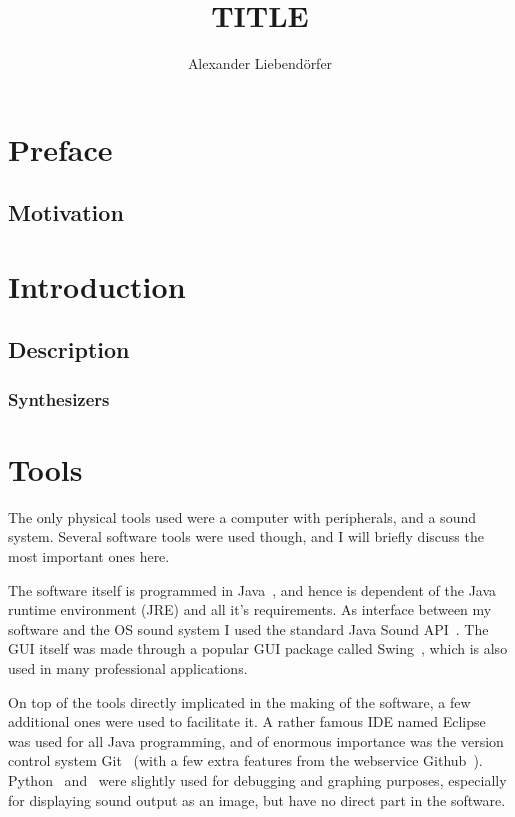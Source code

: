 \documentclass[11pt,a4paper]{article}
\title{\LARGE \textbf {TITLE} \vspace{1em}}
\author{Alexander Liebend\"{o}rfer}
\begin{document}
\maketitle
\clearpage
\tableofcontents

\clearpage

\section{Preface}

\subsection{Motivation}

\section{Introduction}

\subsection{Description}

\subsubsection{Synthesizers}

\section{Tools}

The only physical tools used were a computer with peripherals, and a sound system. Several software tools were used though, and I will briefly discuss the most important ones here.

The software itself is programmed in Java~\cite{Java}, and hence is dependent of the Java runtime environment (JRE) and all it's requirements. As interface between my software and the OS sound system I used the standard Java Sound API~\cite{Javasound}. The GUI itself was made through a popular GUI package called Swing~\cite{Swing}, which is also used in many professional applications.

On top of the tools directly implicated in the making of the software, a few additional ones were used to fac‎ilitate it. A rather famous IDE named Eclipse~\cite{Eclipse} was used for all Java programming, and of enormous importance was the version control system Git~\cite{Git} (with a few extra features from the webservice Github~\cite{Github}). Python~\cite{Python} and~\cite{Veusz} were slightly used for debugging and graphing purposes, especially for displaying sound output as an image, but have no direct part in the software.
\end{document}
